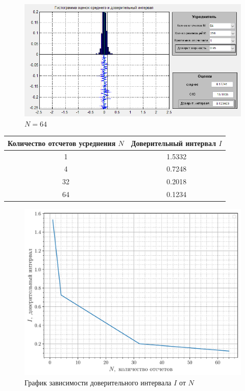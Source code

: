 \begin{figure}[H]
\begin{minipage}{.5\linewidth}
	\caption*{$N = 32$}
	\end{minipage}
	\begin{minipage}{.5\linewidth}
		\centering
        \includegraphics[width=\linewidth]{fig/fig64}
	\caption*{$N = 64$}
	\end{minipage}
\end{figure}
\begin{table}[htbp]
	\centering
	\begin{tabular}{|c|c|}
		\toprule
		\multicolumn{1}{|c|}{\textbf{Количество отсчетов усреднения $N$}} & \textbf{Доверительный интервал $I$} \\
		\midrule
		1     & 1.5332 \\
		\midrule
		4     & 0.7248 \\
		\midrule
		32    & 0.2018 \\
		\midrule
		64    & 0.1234 \\
		\bottomrule
	\end{tabular}%
	\label{tab:addlabel}%
\end{table}%
 \begin{figure}[H]
	\centering
    \includegraphics[width=0.8\linewidth]{fig/plot2}
	\caption*{График зависимости доверительного интервала $I$ от $N$}
	\end{figure}

